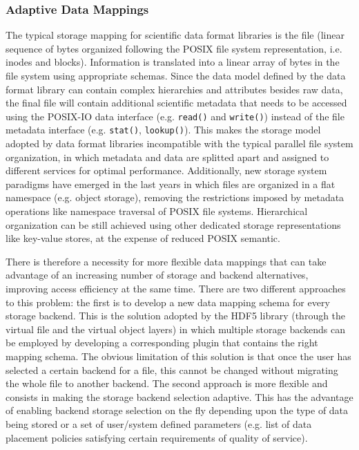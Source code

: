

\subsubsection{Adaptive Data Mappings}
The typical storage mapping for scientific data format libraries is the file (linear sequence of bytes organized following the POSIX file system representation, i.e. inodes and blocks). Information is translated into a linear array of bytes in the file system using appropriate schemas. Since the data model defined by the data format library can contain complex hierarchies and attributes besides raw data, the final file will contain additional scientific metadata that needs to be accessed using the POSIX-IO data interface (e.g. \texttt{read()} and \texttt{write()}) instead of the file metadata interface (e.g. \texttt{stat()}, \texttt{lookup()}). This makes the storage model adopted by data format libraries incompatible with the typical parallel file system organization, in which metadata and data are splitted apart and assigned to different services for optimal performance. Additionally, new storage system paradigms have emerged in the last years in which files are organized in a flat namespace (e.g. object storage), removing the restrictions imposed by metadata operations like namespace traversal of POSIX file systems. Hierarchical organization can be still achieved using other dedicated storage representations like key-value stores, at the expense of reduced POSIX semantic.

There is therefore a necessity for more flexible data mappings that can take advantage of an increasing number of storage and backend alternatives, improving access efficiency at the same time. There are two different approaches to this problem: the first is to develop a new data mapping schema for every storage backend. This is the solution adopted by the HDF5 library (through the virtual file and the virtual object layers) in which multiple storage backends can be employed by developing a corresponding plugin that contains the right mapping schema. The obvious limitation of this solution is that once the user has selected a certain backend for a file, this cannot be changed without migrating the whole file to another backend. The second approach is more flexible and consists in making the storage backend selection adaptive. This has the advantage of enabling backend storage selection on the fly depending upon the type of data being stored or a set of user/system defined parameters (e.g. list of data placement policies satisfying certain requirements of quality of service).

